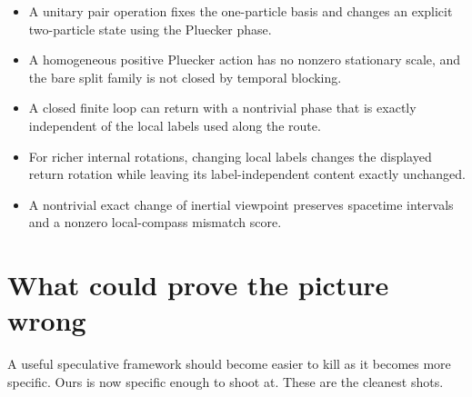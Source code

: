 \documentclass[11pt]{article}
\begin{document}
\begin{itemize}
        preserves number and even/odd parity.
  \item A unitary pair operation fixes the one-particle basis and changes an
        explicit two-particle state using the Pluecker phase.
  \item A homogeneous positive Pluecker action has no nonzero stationary scale,
        and the bare split family is not closed by temporal blocking.
  \item A closed finite loop can return with a nontrivial phase that is exactly
        independent of the local labels used along the route.
  \item For richer internal rotations, changing local labels changes the
        displayed return rotation while leaving its label-independent content
        exactly unchanged.
  \item A nontrivial exact change of inertial viewpoint preserves spacetime
        intervals and a nonzero local-compass mismatch score.
\end{itemize}

\section{What could prove the picture wrong}
\label{sec:kill}

A useful speculative framework should become easier to kill as it becomes more
specific.  Ours is now specific enough to shoot at.  These are the cleanest
shots.
\end{document}

